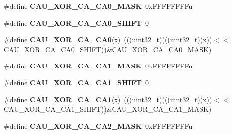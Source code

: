\begin{DoxyCompactItemize}
\item 
\#define {\bfseries C\+A\+U\+\_\+\+X\+O\+R\+\_\+\+C\+A\+\_\+\+C\+A0\+\_\+\+M\+A\+SK}~0x\+F\+F\+F\+F\+F\+F\+F\+Fu\hypertarget{group__CAU__Register__Masks_ga1b5b9a631549a09772404a13cc8bb2c6}{}\label{group__CAU__Register__Masks_ga1b5b9a631549a09772404a13cc8bb2c6}

\item 
\#define {\bfseries C\+A\+U\+\_\+\+X\+O\+R\+\_\+\+C\+A\+\_\+\+C\+A0\+\_\+\+S\+H\+I\+FT}~0\hypertarget{group__CAU__Register__Masks_ga668e19ef62b1ef693c25a076b8102ad1}{}\label{group__CAU__Register__Masks_ga668e19ef62b1ef693c25a076b8102ad1}

\item 
\#define {\bfseries C\+A\+U\+\_\+\+X\+O\+R\+\_\+\+C\+A\+\_\+\+C\+A0}(x)~(((uint32\+\_\+t)(((uint32\+\_\+t)(x))$<$$<$C\+A\+U\+\_\+\+X\+O\+R\+\_\+\+C\+A\+\_\+\+C\+A0\+\_\+\+S\+H\+I\+FT))\&C\+A\+U\+\_\+\+X\+O\+R\+\_\+\+C\+A\+\_\+\+C\+A0\+\_\+\+M\+A\+SK)\hypertarget{group__CAU__Register__Masks_gaf21ab1d961463e2f4288e40a44f3cb83}{}\label{group__CAU__Register__Masks_gaf21ab1d961463e2f4288e40a44f3cb83}

\item 
\#define {\bfseries C\+A\+U\+\_\+\+X\+O\+R\+\_\+\+C\+A\+\_\+\+C\+A1\+\_\+\+M\+A\+SK}~0x\+F\+F\+F\+F\+F\+F\+F\+Fu\hypertarget{group__CAU__Register__Masks_ga9aaaf6dc6a0bb9f82e566fbc29dc9f2c}{}\label{group__CAU__Register__Masks_ga9aaaf6dc6a0bb9f82e566fbc29dc9f2c}

\item 
\#define {\bfseries C\+A\+U\+\_\+\+X\+O\+R\+\_\+\+C\+A\+\_\+\+C\+A1\+\_\+\+S\+H\+I\+FT}~0\hypertarget{group__CAU__Register__Masks_gae0c5144e0bc6b1bc363388cc0724ad4a}{}\label{group__CAU__Register__Masks_gae0c5144e0bc6b1bc363388cc0724ad4a}

\item 
\#define {\bfseries C\+A\+U\+\_\+\+X\+O\+R\+\_\+\+C\+A\+\_\+\+C\+A1}(x)~(((uint32\+\_\+t)(((uint32\+\_\+t)(x))$<$$<$C\+A\+U\+\_\+\+X\+O\+R\+\_\+\+C\+A\+\_\+\+C\+A1\+\_\+\+S\+H\+I\+FT))\&C\+A\+U\+\_\+\+X\+O\+R\+\_\+\+C\+A\+\_\+\+C\+A1\+\_\+\+M\+A\+SK)\hypertarget{group__CAU__Register__Masks_ga76cb28e96e7397374f2da8d835304611}{}\label{group__CAU__Register__Masks_ga76cb28e96e7397374f2da8d835304611}

\item 
\#define {\bfseries C\+A\+U\+\_\+\+X\+O\+R\+\_\+\+C\+A\+\_\+\+C\+A2\+\_\+\+M\+A\+SK}~0x\+F\+F\+F\+F\+F\+F\+F\+Fu\hypertarget{group__CAU__Register__Masks_ga710ad3a23664ea7f219a37d7a5402362}{}\label{group__CAU__Register__Masks_ga710ad3a23664ea7f219a37d7a5402362}


\end{DoxyCompactItemize}
